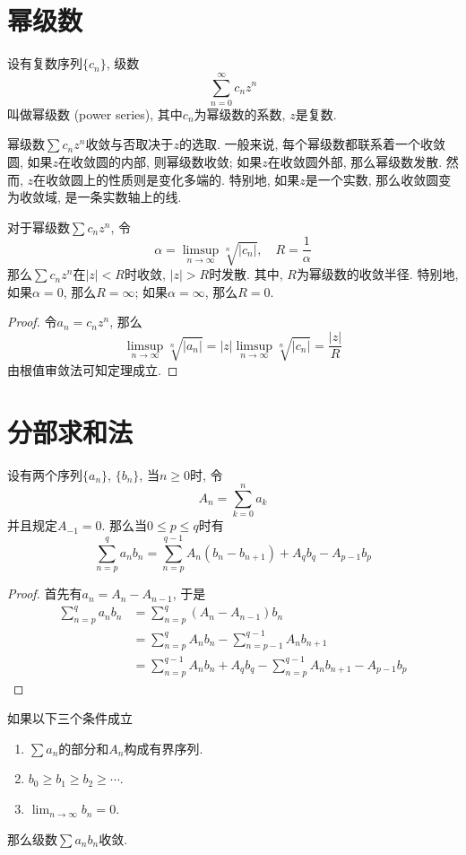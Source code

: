 \documentclass[cn,12pt,math=mtpro2,citestyle=gb7714-2015,bibstyle=gb7714-2015,twocol]{elegantbook}
\newcommand{\limn}{\lim_{n\to\infty}}
\begin{document}
\section{幂级数}
\begin{definition}
设有复数序列$\{c_n\}$, 级数
$$\sum_{n=0}^{\infty}c_nz^n$$
叫做幂级数 (power series), 其中$c_n$为幂级数的系数, $z$是复数.
\end{definition}
幂级数$\sum c_nz^n$收敛与否取决于$z$的选取. 一般来说, 每个幂级数都联系着一个收敛圆, 如果$z$在收敛圆的内部, 则幂级数收敛; 如果$z$在收敛圆外部, 那么幂级数发散. 然而, $z$在收敛圆上的性质则是变化多端的. 特别地, 如果$z$是一个实数, 那么收敛圆变为收敛域, 是一条实数轴上的线.
\begin{theorem}\label{thm:th3.16}
  对于幂级数$\sum c_nz^n$, 令
  $$\alpha=\limsup_{n\to\infty}\sqrt[n]{|c_n|},\quad R=\frac{1}{\alpha}$$
  那么$\sum c_nz^n$在$|z|<R$时收敛, $|z|>R$时发散.  其中, $R$为幂级数的收敛半径. 特别地, 如果$\alpha=0$, 那么$R=\infty$; 如果$\alpha=\infty$, 那么$R=0$.
\end{theorem}
\begin{proof}
  令$a_n=c_nz^n$, 那么
  $$\limsup_{n\to\infty} \sqrt[n]{|a_n|}=|z|\limsup_{n\to\infty} \sqrt[n]{|c_n|}=\frac{|z|}{R}$$
  由根值审敛法可知定理成立.

\end{proof}

\section{分部求和法}
\begin{theorem}\label{thm:th3.13}
  设有两个序列$\{a_n\}$, $\{b_n\}$, 当$n\geq 0$时, 令
  $$A_n=\sum_{k=0}^{n}a_k$$
  并且规定$A_{-1}=0$. 那么当$0\leq p \leq q$时有
  $$\sum_{n=p}^{q}a_nb_n=\sum_{n=p}^{q-1}A_n(b_n-b_{n+1})+A_qb_q-A_{p-1}b_p$$
\end{theorem}
\begin{proof}
  首先有$a_n=A_n-A_{n-1}$, 于是
  \begin{align*}
  \sum_{n=p}^{q}a_nb_n&=\sum_{n=p}^{q}(A_n-A_{n-1})b_n \\
  &=\sum_{n=p}^{q}A_nb_n-\sum_{n=p-1}^{q-1}A_nb_{n+1} \\
  &=\sum_{n=p}^{q-1}A_nb_n+A_qb_q-\sum_{n=p}^{q-1}A_nb_{n+1}-A_{p-1}b_p
  \end{align*}

\end{proof}
\begin{theorem}[Dirichlet判别法]\label{thm:th3.14}
  如果以下三个条件成立
  \begin{enumerate}[label=(\arabic*)]
  \item $\sum a_n$的部分和$A_n$构成有界序列.

  \item $b_0\geq b_1\geq b_2\geq \cdots$.

  \item $\displaystyle\limn b_n=0$.
  \end{enumerate}
  那么级数$\sum a_nb_n$收敛.
\end{theorem}
\end{document}
